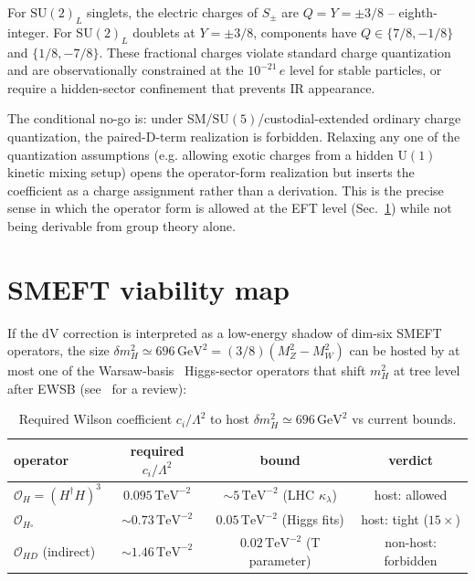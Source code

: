 \documentclass[twocolumn,aps,prd,floatfix,nofootinbib,superscriptaddress,10pt]{article}
\newcommand{\MW}{M_W}
\newcommand{\MZ}{M_Z}
\newcommand{\mH}{m_H}
\begin{document}
For $\mathrm{SU}(2)_L$ singlets, the electric charges of $S_\pm$ are $Q=Y=\pm 3/8$ -- eighth-integer.  For $\mathrm{SU}(2)_L$ doublets at $Y=\pm 3/8$, components have $Q\in\{7/8,-1/8\}$ and $\{1/8,-7/8\}$.  These fractional charges violate standard charge quantization and are observationally constrained at the $10^{-21}\,e$ level for stable particles, or require a hidden-sector confinement that prevents IR appearance.

The conditional no-go is: under SM/$\mathrm{SU}(5)$/custodial-extended ordinary charge quantization, the paired-D-term realization is forbidden.  Relaxing any one of the quantization assumptions (e.g. allowing exotic charges from a hidden $\mathrm{U}(1)$ kinetic mixing setup) opens the operator-form realization but inserts the coefficient as a charge assignment rather than a derivation.  This is the precise sense in which the operator form is allowed at the EFT level (Sec.~\ref{sec:SMEFT}) while not being derivable from group theory alone.

\section{SMEFT viability map}
\label{sec:SMEFT}

If the dV correction is interpreted as a low-energy shadow of dim-six SMEFT operators, the size $\delta\mH^2\simeq 696\,\mathrm{GeV}^2 = (3/8)(\MZ^2-\MW^2)$ can be hosted by at most one of the Warsaw-basis~\cite{Grzadkowski2010} Higgs-sector operators that shift $\mH^2$ at tree level after EWSB (see~\cite{BrivioTrott2019} for a review):

\begin{table}[h]
\centering
\caption{Required Wilson coefficient $c_i/\Lambda^2$ to host $\delta\mH^2\simeq 696\,\mathrm{GeV}^2$ vs current bounds.}
\label{tab:smeft}
\begin{tabular}{lccc}
\toprule
operator & required $c_i/\Lambda^2$ & bound & verdict \\
\midrule
$\mathcal O_H=(H^\dag H)^3$ & $0.095\,\mathrm{TeV}^{-2}$ & $\sim 5\,\mathrm{TeV}^{-2}$ (LHC $\kappa_\lambda$) & host: allowed \\
$\mathcal O_{H\square}$ & $\sim 0.73\,\mathrm{TeV}^{-2}$ & $0.05\,\mathrm{TeV}^{-2}$ (Higgs fits) & host: tight ($15\times$) \\
$\mathcal O_{HD}$ (indirect) & $\sim 1.46\,\mathrm{TeV}^{-2}$ & $0.02\,\mathrm{TeV}^{-2}$ (T parameter) & non-host: forbidden \\
\bottomrule
\end{tabular}
\end{table}
\end{document}
